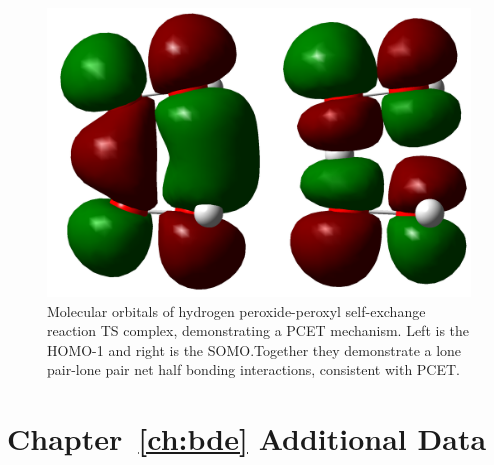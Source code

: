 \begin{figure}[H]
  \centering
  \includegraphics[width=\textwidth]{figures/hoohooh_TS.png}
  \caption[Molecular orbitals of hydrogen peroxide-peroxyl self-exchange reaction TS complex, demonstrating a PCET mechanism.]{Molecular orbitals of hydrogen peroxide-peroxyl self-exchange reaction TS complex, demonstrating a PCET mechanism. Left is the HOMO-1 and right is the SOMO.\@ Together they demonstrate a lone pair-lone pair net half bonding interactions, consistent with PCET.}
  \label{fig:hooh-ooh}
\end{figure}

\chapter{Chapter~\protect\ref{ch:bde} Additional Data}\label{ap:bde}

